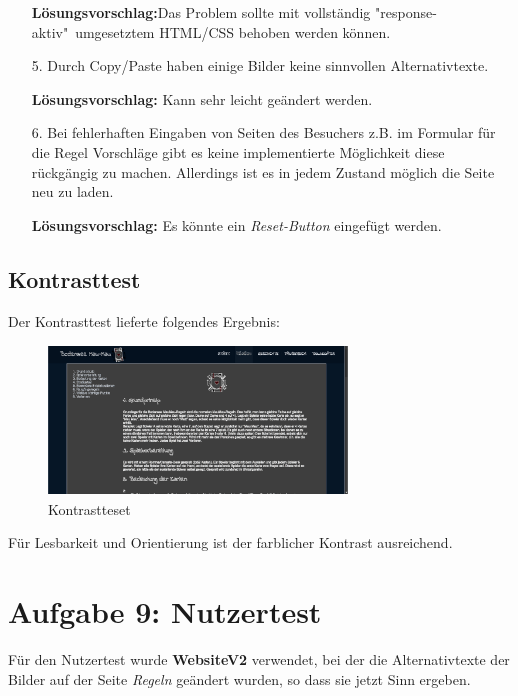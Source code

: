 \documentclass{scrartcl}
\begin{document}
\begin{itemize}
\textbf{Lösungsvorschlag:}Das Problem sollte mit vollständig "response-aktiv"\ umgesetztem HTML/CSS behoben werden können.

\item[5.]Durch Copy/Paste haben einige Bilder keine sinnvollen Alternativtexte.

\textbf{Lösungsvorschlag:} Kann sehr leicht geändert werden.

\item[6.] Bei fehlerhaften Eingaben von Seiten des Besuchers z.B. im Formular für die Regel Vorschläge gibt es keine implementierte Möglichkeit diese rückgängig zu machen. Allerdings ist es in jedem Zustand möglich die Seite neu zu laden.

\textbf{Lösungsvorschlag:} Es könnte ein \textit{Reset-Button} eingefügt werden. 
\end{itemize}
\subsection*{Kontrasttest}

Der Kontrasttest lieferte folgendes Ergebnis:
\begin{figure}[H]
 \centering
   \includegraphics[width=300px, height=150px]{contrast.png}
\caption{Kontrastteset}
\end{figure}


Für Lesbarkeit und Orientierung ist der farblicher Kontrast ausreichend.



\section*{Aufgabe 9: Nutzertest}
Für den Nutzertest wurde \textbf{WebsiteV2} verwendet, bei der die Alternativtexte der Bilder auf der Seite \textit{Regeln} geändert wurden, so dass sie jetzt Sinn ergeben.
\end{document}
